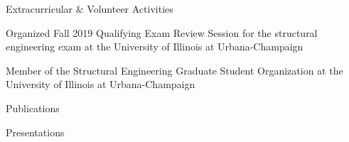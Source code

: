 \documentclass{resume} %
\begin{document}

\begin{rSection}{Extracurricular \& Volunteer Activities}{}
\begin{rSubsection}{}{}{}{}
\item Organized Fall 2019 Qualifying Exam Review Session for the structural engineering exam at the University of Illinois at Urbana-Champaign
\item Member of the Structural Engineering Graduate Student Organization at the University of Illinois at Urbana-Champaign
\end{rSubsection}
\end{rSection}




\begin{rSection}{Publications}{}
\begin{rSubsection}{}{}{}{}
\item {}
\item {}
\item {}
\item {}
\item {}
\item {}
\item {}
\end{rSubsection}
\end{rSection}


\begin{rSection}{Presentations}{}
\begin{rSubsection}{}{}{}{}
\item {}
\item {}
\item {}
\item {}
\item {}
\item {}
\end{rSubsection}
\end{rSection}
\end{document}
